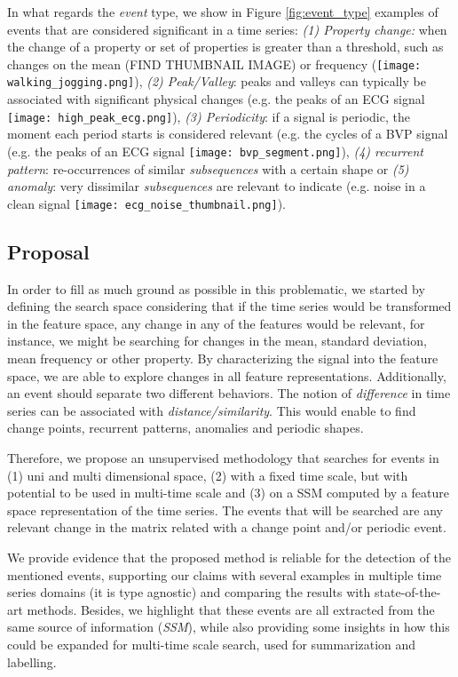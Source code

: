 In what regards the \textit{event} type, we show in Figure \ref{fig:event_type} examples of events that are considered significant in a time series: \textit{(1) Property change:} when the change of a property or set of properties is greater than a threshold, such as changes on the mean (FIND THUMBNAIL IMAGE) or frequency (\texttt{[image: walking\_jogging.png]}), \textit{(2) Peak/Valley}: peaks and valleys can typically be associated with significant physical changes (e.g. the peaks of an ECG signal \texttt{[image: high\_peak\_ecg.png]}), \textit{(3) Periodicity}: if a signal is periodic, the moment each period starts is considered relevant (e.g. the cycles of a BVP signal (e.g. the peaks of an ECG signal \texttt{[image: bvp\_segment.png]}), \textit{(4) recurrent pattern}: re-occurrences of similar \textit{subsequences} with a certain shape or \textit{(5) anomaly}: very dissimilar \textit{subsequences} are relevant to indicate (e.g. noise in a clean signal \texttt{[image: ecg\_noise\_thumbnail.png]}).

\subsection{Proposal}

In order to fill as much ground as possible in this problematic, we started by defining the search space considering that if the time series would be transformed in the feature space, any change in any of the features would be relevant, for instance, we might be searching for changes in the mean, standard deviation, mean frequency or other property. By characterizing the signal into the feature space, we are able to explore changes in all feature representations. Additionally, an event should separate two different behaviors. The notion of \textit{difference} in time series can be associated with \textit{distance/similarity}. This would enable to find change points, recurrent patterns, anomalies and periodic shapes. 
\par
Therefore, we propose an unsupervised methodology that searches for events in (1) uni and multi dimensional space, (2) with a fixed time scale, but with potential to be used in multi-time scale and (3) on a \gls{SSM} computed by a feature space representation of the time series. The events that will be searched are any relevant change in the matrix related with a change point and/or periodic event.
\par
We provide evidence that the proposed method is reliable for the detection of the mentioned events, supporting our claims with several examples in multiple time series domains (it is type agnostic) and comparing the results with state-of-the-art methods. Besides, we highlight that these events are all extracted from the same source of information (\textit{SSM}), while also providing some insights in how this could be expanded for multi-time scale search, used for summarization and labelling.
    
